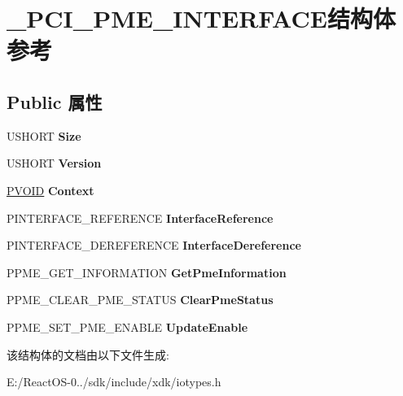 \hypertarget{struct___p_c_i___p_m_e___i_n_t_e_r_f_a_c_e}{}\section{\+\_\+\+P\+C\+I\+\_\+\+P\+M\+E\+\_\+\+I\+N\+T\+E\+R\+F\+A\+C\+E结构体 参考}
\label{struct___p_c_i___p_m_e___i_n_t_e_r_f_a_c_e}
\subsection*{Public 属性}
\begin{DoxyCompactItemize}
\item 
\mbox{\label{struct___p_c_i___p_m_e___i_n_t_e_r_f_a_c_e_a7fe7f51fc7386158e29690b4e00a3566}} 
U\+S\+H\+O\+RT {\bfseries Size}
\item 
\mbox{\label{struct___p_c_i___p_m_e___i_n_t_e_r_f_a_c_e_ae39005410b31e01a72197434ab6aefce}} 
U\+S\+H\+O\+RT {\bfseries Version}
\item 
\mbox{\label{struct___p_c_i___p_m_e___i_n_t_e_r_f_a_c_e_a4c15c9c7aaa7192b341766b7263cfa82}} 
\hyperlink{interfacevoid}{P\+V\+O\+ID} {\bfseries Context}
\item 
\mbox{\label{struct___p_c_i___p_m_e___i_n_t_e_r_f_a_c_e_adc60a78909c7699b0d9df8f0df0eb80d}} 
P\+I\+N\+T\+E\+R\+F\+A\+C\+E\+\_\+\+R\+E\+F\+E\+R\+E\+N\+CE {\bfseries Interface\+Reference}
\item 
\mbox{\label{struct___p_c_i___p_m_e___i_n_t_e_r_f_a_c_e_abe779e7570f9814047892a872e2a7d67}} 
P\+I\+N\+T\+E\+R\+F\+A\+C\+E\+\_\+\+D\+E\+R\+E\+F\+E\+R\+E\+N\+CE {\bfseries Interface\+Dereference}
\item 
\mbox{\label{struct___p_c_i___p_m_e___i_n_t_e_r_f_a_c_e_a950f132159ee3c5a19bf2418a0358d55}} 
P\+P\+M\+E\+\_\+\+G\+E\+T\+\_\+\+I\+N\+F\+O\+R\+M\+A\+T\+I\+ON {\bfseries Get\+Pme\+Information}
\item 
\mbox{\label{struct___p_c_i___p_m_e___i_n_t_e_r_f_a_c_e_a9bd0adc72db685ce7e2f734adb13c3f7}} 
P\+P\+M\+E\+\_\+\+C\+L\+E\+A\+R\+\_\+\+P\+M\+E\+\_\+\+S\+T\+A\+T\+US {\bfseries Clear\+Pme\+Status}
\item 
\mbox{\label{struct___p_c_i___p_m_e___i_n_t_e_r_f_a_c_e_ae99a0d3ba0a31f676c2e488cf163a0a0}} 
P\+P\+M\+E\+\_\+\+S\+E\+T\+\_\+\+P\+M\+E\+\_\+\+E\+N\+A\+B\+LE {\bfseries Update\+Enable}
\end{DoxyCompactItemize}


该结构体的文档由以下文件生成\+:\begin{DoxyCompactItemize}
\item 
E\+:/\+React\+O\+S-\/0../sdk/include/xdk/iotypes.\+h\end{DoxyCompactItemize}
